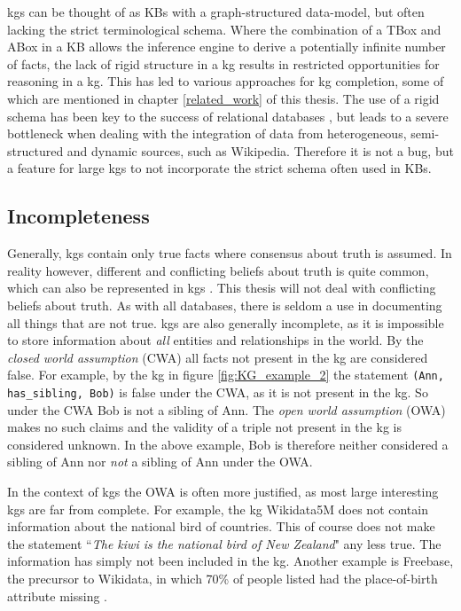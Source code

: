 \glspl{kg} can be thought of as KBs with a graph-structured data-model, but often lacking the strict terminological schema. Where the combination of a TBox and ABox in a KB allows the inference engine to derive a potentially infinite number of facts, the lack of rigid structure in a \gls{kg} results in restricted opportunities for reasoning in a \gls{kg}. This has led to various approaches for \gls{kg} completion, some of which are mentioned in chapter \ref{related_work} of this thesis. The use of a rigid schema has been key to the success of relational databases \cite{codd2002relational}, but leads to a severe bottleneck when dealing with the integration of data from heterogeneous, semi-structured and dynamic sources, such as Wikipedia. Therefore it is not a bug, but a feature for large \glspl{kg} to not incorporate the strict schema often used in KBs.

\subsection{Incompleteness}
\label{Integrity_of_KGs}
Generally, \glspl{kg} contain only true facts where consensus about truth is assumed. In reality however, different and conflicting beliefs about truth is quite common, which can also be represented in \glspl{kg} \cite{subjective_kgs}. This thesis will not deal with conflicting beliefs about truth. As with all databases, there is seldom a use in documenting all things that are not true. \glspl{kg} are also generally incomplete, as it is impossible to store information about \textit{all} entities and relationships in the world. By the \textit{closed world assumption} (CWA) all facts not present in the \gls{kg} are considered false. For example, by the \gls{kg} in figure \ref{fig:KG_example_2} the statement \texttt{(Ann, has\_sibling, Bob)} is false under the CWA, as it is not present in the \gls{kg}. So under the CWA Bob is not a sibling of Ann. The \textit{open world assumption} (OWA) makes no such claims and  the validity of a triple not present in the \gls{kg} is considered unknown. In the above example, Bob is therefore neither considered a sibling of Ann nor \textit{not} a sibling of Ann under the OWA.

In the context of \glspl{kg} the OWA is often more justified, as most large interesting \glspl{kg} are far from complete. For example, the \gls{kg} Wikidata5M does not contain information about the national bird of countries. This of course does not make the statement ``\textit{The kiwi is the national bird of New Zealand}" any less true. The information has simply not been included in the \gls{kg}. Another example is Freebase, the precursor to Wikidata, in which 70\% of people listed had the place-of-birth attribute missing \cite{west2014knowledge}.

